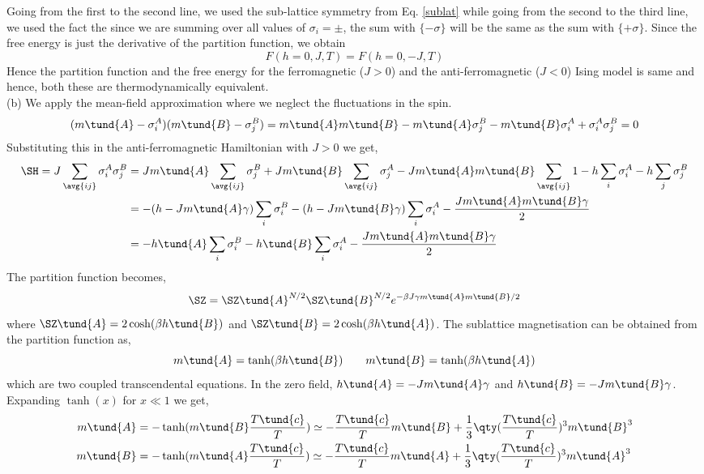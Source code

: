 Going from the first to the second line, we used the sub-lattice symmetry from Eq. \eqref{sublat} while going from the second to the third line, we used the fact the since we are summing over all values of $\sigma_i = \pm$, the sum with $\{ -\sigma\}$ will be the same as the sum with $\{ +\sigma\}$. Since the free energy is just the derivative of the partition function, we obtain 
\begin{equation}
    F(h=0, J, T) = F(h=0, -J, T)
\end{equation}
Hence the partition function and the free energy for the ferromagnetic ($J>0$) and the anti-ferromagnetic ($J<0$) Ising model is same and hence, both these are thermodynamically equivalent.\\[0.3cm]
(b) We apply the mean-field approximation where we neglect the fluctuations in the spin.
\begin{equation}
    (m\tund{A} - \sigma^A_i) (m\tund{B} - \sigma^B_j) = m\tund{A}m\tund{B} -m\tund{A}\sigma_j^B - m\tund{B}\sigma_i^A + \sigma_i^A \sigma_j^B = 0
\end{equation}
Substituting this in the anti-ferromagnetic Hamiltonian with $J>0$ we get,
\begin{align*}
    \SH = J \sum\limits_{\avg{ij}} \sigma_i^A \sigma_j^B &= Jm\tund{A} \sum\limits_{\avg{ij}}\sigma_j^B + Jm\tund{B} \sum\limits_{\avg{ij}}\sigma_j^A -J m\tund{A}m\tund{B}\sum\limits_{\avg{ij}} 1 -h \sum_{i}\sigma_i^A -h\sum_{j}\sigma_j^B\\
    &=-(h-Jm\tund{A}\gamma)\sum\limits_i \sigma_i^B -(h-Jm\tund{B}\gamma)\sum\limits_i \sigma_i^A - \frac{Jm\tund{A}m\tund{B}\gamma}{2}\\
    &= -h\tund{A}\sum\limits_i \sigma_i^B -h\tund{B}\sum\limits_i \sigma_i^A -  \frac{Jm\tund{A}m\tund{B}\gamma}{2}
\end{align*}
The partition function becomes, 
$$\SZ = \SZ\tund{A}^{N/2} \SZ\tund{B}^{N/2} e^{-\beta J \gamma m\tund{A}m\tund{B}/2 }$$
where $\SZ\tund{A} = 2\cosh(\beta h\tund{B})$ and $\SZ\tund{B} = 2\cosh(\beta h\tund{A})$. The sublattice magnetisation can be obtained from the partition function as,
\begin{equation}
    m\tund{A} = \tanh(\beta h\tund{B}) \qquad m\tund{B} = \tanh(\beta h\tund{A})
\end{equation}
which are two coupled transcendental equations. In the zero field, $h\tund{A} = -Jm\tund{A}\gamma$ and $h\tund{B} = -Jm\tund{B}\gamma$. Expanding $\tanh(x)$ for $x\ll 1$ we get, 
\begin{align}\label{magg}
    \begin{split}
         m\tund{A} &= - \tanh(m\tund{B} \frac{T\tund{c}}{T}) \simeq -\frac{T\tund{c}}{T}m\tund{B}  +\frac{1}{3}\qty(\frac{T\tund{c}}{T})^3 m\tund{B}^3\\
     m\tund{B} &= - \tanh(m\tund{A} \frac{T\tund{c}}{T}) \simeq -\frac{T\tund{c}}{T}m\tund{A}  +\frac{1}{3}\qty(\frac{T\tund{c}}{T})^3 m\tund{A}^3
    \end{split}
\end{align}
